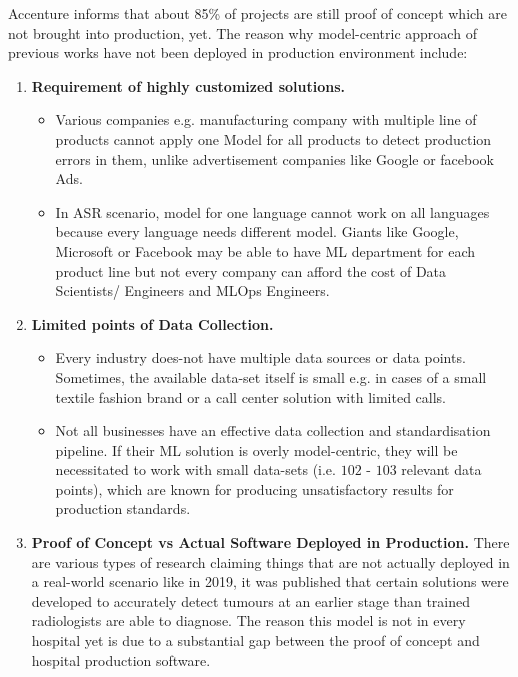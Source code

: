 Accenture \cite{noauthor_scaling_nodate} informs that about 85\% of projects are still proof of concept \cite{noauthor_data-centric_nodate} which are not brought into production, yet. The reason why model-centric approach of previous works have not been deployed in production environment include:

\begin{enumerate}
    \item \textbf{Requirement of highly customized solutions.} 
    \begin{itemize}
        \item Various companies e.g. manufacturing company with multiple line of products cannot apply one Model for all products to detect production errors in them, unlike advertisement companies like Google or facebook Ads.
        \item In ASR scenario, model for one language cannot work on all languages because every language needs different model. Giants like Google, Microsoft or Facebook may be able to have ML department for each product line but not every company can afford the cost of Data Scientists/ Engineers and MLOps Engineers.
    \end{itemize}
    \item \textbf{Limited points of Data Collection.} 
    \begin{itemize} 
        \item Every industry does-not have multiple data sources or data points. Sometimes, the available data-set itself is small e.g. in cases of a small textile fashion brand or a call center solution with limited calls. 
        \item Not all businesses have an effective data collection and standardisation pipeline. If their ML solution is overly model-centric, they will be necessitated to work with small data-sets (i.e. $102$ - $103$ relevant data points), which are known for producing unsatisfactory results for production standards.      
    \end{itemize}
    \item \textbf{Proof of Concept vs Actual Software Deployed in Production.} There are various types of research claiming things that are not actually deployed in a real-world scenario like in 2019, it was published \cite{ardila_end--end_2019} that certain solutions were developed to accurately detect tumours at an earlier stage than trained radiologists are able to diagnose. The reason this model is not in every hospital yet is due to a substantial gap between the proof of concept and hospital production software. 
\end{enumerate}

